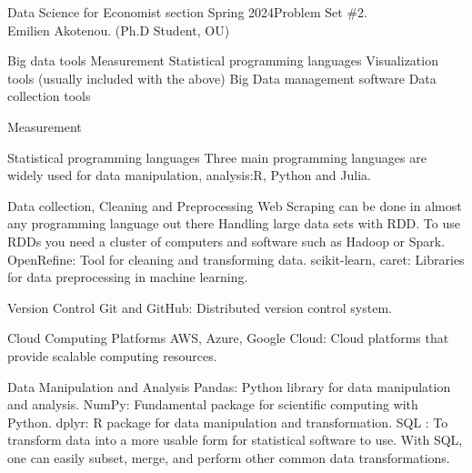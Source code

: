 \documentclass[12pt]{article}
\begin{document}
\noindent Data Science for Economist section Spring 2024\hfill Problem Set \#2.\\
Emilien Akotenou. (Ph.D Student, OU)

\hrulefill


\begin{section}{Big data tools}
Measurement
Statistical programming languages
Visualization tools (usually included with the above)
Big Data management software
Data collection tools

\begin{subsection}{Measurement }
   
\end{subsection} 
\begin{subsection}{Statistical programming languages}
Three main programming languages are widely used for data manipulation, analysis:R, Python and Julia.  
\end{subsection} 
\begin{subsection}{Data collection, Cleaning and Preprocessing}
Web Scraping can be done in almost any programming language out there
Handling large data sets with RDD.  To use RDDs you need a cluster of computers and software such as Hadoop or Spark. \newline
 OpenRefine: Tool for cleaning and transforming data. \newline
scikit-learn, caret: Libraries for data preprocessing in machine learning.  
\end{subsection} 
\begin{subsection}{Version Control}
Git and GitHub: Distributed version control system.   
\end{subsection} 
\begin{subsection}{Cloud Computing Platforms}
AWS, Azure, Google Cloud: Cloud platforms that provide scalable computing resources.   
\end{subsection}

\begin{subsection}{Data Manipulation and Analysis}
Pandas: Python library for data manipulation and analysis. \newline
NumPy: Fundamental package for scientific computing with Python. \newline
dplyr: R package for data manipulation and transformation.  \newline
SQL : To transform data into a more usable form for statistical software to use. With SQL, one can easily subset, merge, and perform other common data transformations.
\end{subsection}


\end{section}
\end{document}
